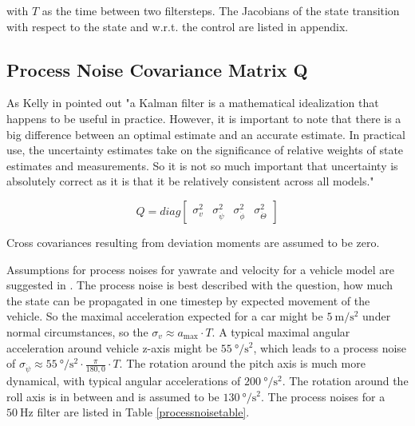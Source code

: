 \documentclass[conference]{IEEEtran}
\begin{document}
with $T$ as the time between two filtersteps. The Jacobians of the state transition with respect to the state and w.r.t. the control are listed in appendix.

\subsection{Process Noise Covariance Matrix Q}

As Kelly in \cite{Kelly1994} pointed out "a Kalman filter is a mathematical idealization that happens to be useful in practice. However, it is important to note that there is a big difference between an optimal estimate and an accurate estimate. In practical use, the uncertainty estimates take on the significance of relative weights of state estimates and measurements. So it is not so much important that uncertainty is absolutely correct as it is that it be relatively consistent across all models."

\begin{equation}Q=diag\label{Q}\left[\begin{matrix}\sigma_{v}^2 & \sigma_{{\dot\psi}}^2 & \sigma_{{\dot\phi}}^2 & \sigma_{{\dot\Theta}}^2 \end{matrix}\right]\end{equation}

Cross covariances resulting from deviation moments are assumed to be zero.

Assumptions for process noises for yawrate and velocity for a vehicle model are suggested in \cite{Kelly1994}. The process noise is best described with the question, how much the state can be propagated in one timestep by expected movement of the vehicle. So the maximal acceleration expected for a car might be $\SI{5}{\metre\per\square\second}$ under normal circumstances, so the $\sigma_v \approx a_\text{max}\cdot T$.
A typical maximal angular acceleration around vehicle z-axis might be $\SI{55}{\degree\per\square\second}$, which leads to a process noise of $\sigma_{\dot\psi} \approx \SI{55}{\degree\per\square\second} \cdot \frac{\pi}{180{,}0} \cdot T$.
The rotation around the pitch axis is much more dynamical, with typical angular accelerations of $\SI{200}{\degree\per\square\second}$. The rotation around the roll axis is in between and is assumed to be $\SI{130}{\degree\per\square\second}$.
The process noises for a $\SI{50}{\hertz}$ filter are listed in Table \ref{processnoisetable}.
\end{document}
